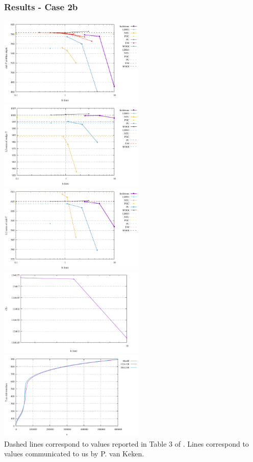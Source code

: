 \newpage
\subsubsection*{Results - Case 2b}

\begin{center}
\includegraphics[width=7cm]{python_codes/fieldstone_68/results/case2b/Tcorner}
\includegraphics[width=7cm]{python_codes/fieldstone_68/results/case2b/Twedge}\\
\includegraphics[width=7cm]{python_codes/fieldstone_68/results/case2b/Tslab}
\includegraphics[width=7cm]{python_codes/fieldstone_68/results/case2b/Tavrg}\\
\includegraphics[width=7cm]{python_codes/fieldstone_68/results/case2b/tempdiag}\\
{\captionfont Dashed lines correspond to values reported in Table 3 of \cite{vack08}.
Lines correspond to values communicated to us by P. van Keken.}
\end{center}

